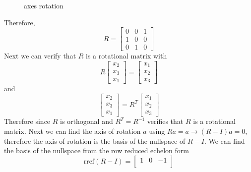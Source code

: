\begin{mdframed}[style=MyFrame]
\begin{figure}[H]
        \caption{axes rotation}
        \label{fig:rotation}
    \end{figure}
    Therefore,
    \begin{equation}
        R =
        \begin{bmatrix}
            0       &       0       &       1       \\
            1       &       0       &       0       \\
            0       &       1       &       0
        \end{bmatrix}
    \end{equation}
    Next we can verify that $R$ is a rotational matrix with 
    \begin{equation}
        R
        \begin{bmatrix}
            x_{2}   \\
            x_{3}   \\
            x_{1}
        \end{bmatrix}
        =
        \begin{bmatrix}
            x_{1}   \\
            x_{2}   \\
            x_{3}
        \end{bmatrix}
    \end{equation}
    and
    \begin{equation}
        \begin{bmatrix}
            x_{2}   \\
            x_{3}   \\
            x_{1}
        \end{bmatrix}
        =
        R^{T}
        \begin{bmatrix}
            x_{1}   \\
            x_{2}   \\
            x_{3}
        \end{bmatrix}
    \end{equation}
    Therefore since $R$ is orthogonal and $R^{T}=R^{-1}$ verifies that $R$
    is a rotational matrix. Next we can find the axis of rotation $a$ using 
    $Ra=a \rightarrow (R-I)a = 0$, therefore the axis of rotation is the
    basis of the nullspace of $R-I$. We can find the basis of the nullspace
    from the row reduced echelon form
    \begin{equation}
        \text{rref}(R-I) =
        \begin{bmatrix}
            1   &   0   &   -1  \\

\end{bmatrix}
\end{equation}
\end{mdframed}
